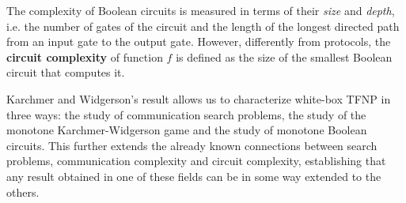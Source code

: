 The complexity of Boolean circuits is measured in terms of their \textit{size} and \textit{depth}, i.e. the number of gates of the circuit and the length of the longest directed path from an input gate to the output gate. However, differently from protocols, the \textbf{circuit complexity} of function $f$ is defined as the size of the smallest Boolean circuit that computes it.

Karchmer and Widgerson's result allows us to characterize white-box \textsf{TFNP} in three ways: the study of communication search problems, the study of the monotone Karchmer-Widgerson game and the study of monotone Boolean circuits. This further extends the already known connections between search problems, communication complexity and circuit complexity, establishing that any result obtained in one of these fields can be in some way extended to the others.


\cleardoublepage